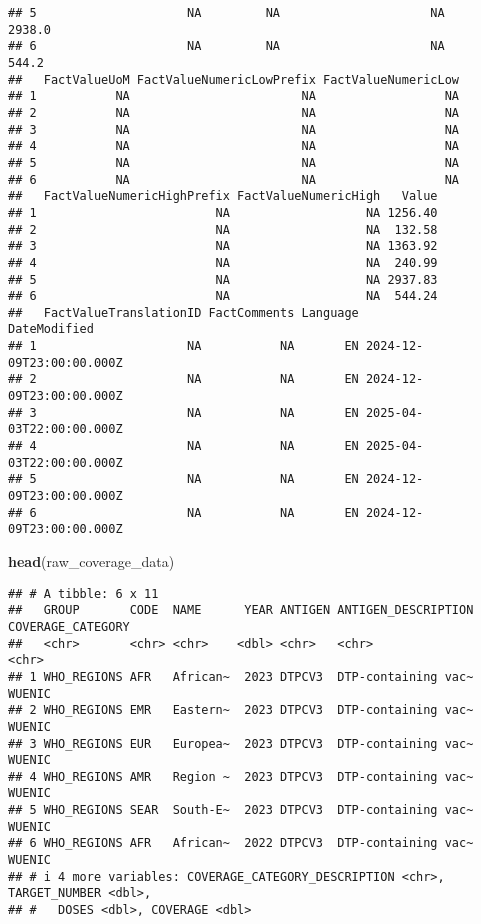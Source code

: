 \documentclass[
]{article}
\newenvironment{Shaded}{\begin{snugshade}}{\end{snugshade}}
\newcommand{\FunctionTok}[1]{\textcolor[rgb]{0.13,0.29,0.53}{\textbf{#1}}}
\newcommand{\NormalTok}[1]{#1}
\begin{document}
\begin{verbatim}
## 5                     NA         NA                     NA           2938.0
## 6                     NA         NA                     NA            544.2
##   FactValueUoM FactValueNumericLowPrefix FactValueNumericLow
## 1           NA                        NA                  NA
## 2           NA                        NA                  NA
## 3           NA                        NA                  NA
## 4           NA                        NA                  NA
## 5           NA                        NA                  NA
## 6           NA                        NA                  NA
##   FactValueNumericHighPrefix FactValueNumericHigh   Value
## 1                         NA                   NA 1256.40
## 2                         NA                   NA  132.58
## 3                         NA                   NA 1363.92
## 4                         NA                   NA  240.99
## 5                         NA                   NA 2937.83
## 6                         NA                   NA  544.24
##   FactValueTranslationID FactComments Language             DateModified
## 1                     NA           NA       EN 2024-12-09T23:00:00.000Z
## 2                     NA           NA       EN 2024-12-09T23:00:00.000Z
## 3                     NA           NA       EN 2025-04-03T22:00:00.000Z
## 4                     NA           NA       EN 2025-04-03T22:00:00.000Z
## 5                     NA           NA       EN 2024-12-09T23:00:00.000Z
## 6                     NA           NA       EN 2024-12-09T23:00:00.000Z
\end{verbatim}

\begin{Shaded}
\begin{Highlighting}[]
\FunctionTok{head}\NormalTok{(raw\_coverage\_data)}
\end{Highlighting}
\end{Shaded}

\begin{verbatim}
## # A tibble: 6 x 11
##   GROUP       CODE  NAME      YEAR ANTIGEN ANTIGEN_DESCRIPTION COVERAGE_CATEGORY
##   <chr>       <chr> <chr>    <dbl> <chr>   <chr>               <chr>            
## 1 WHO_REGIONS AFR   African~  2023 DTPCV3  DTP-containing vac~ WUENIC           
## 2 WHO_REGIONS EMR   Eastern~  2023 DTPCV3  DTP-containing vac~ WUENIC           
## 3 WHO_REGIONS EUR   Europea~  2023 DTPCV3  DTP-containing vac~ WUENIC           
## 4 WHO_REGIONS AMR   Region ~  2023 DTPCV3  DTP-containing vac~ WUENIC           
## 5 WHO_REGIONS SEAR  South-E~  2023 DTPCV3  DTP-containing vac~ WUENIC           
## 6 WHO_REGIONS AFR   African~  2022 DTPCV3  DTP-containing vac~ WUENIC           
## # i 4 more variables: COVERAGE_CATEGORY_DESCRIPTION <chr>, TARGET_NUMBER <dbl>,
## #   DOSES <dbl>, COVERAGE <dbl>
\end{verbatim}
\end{document}
